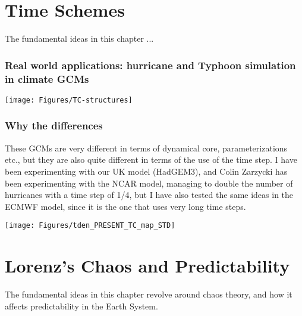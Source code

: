 \documentclass[11pt,fleqn]{book} %
\begin{document}
	
	
\newpage	
{} %
\chapter{Time Schemes}
	\vspace{1em}
	
The fundamental ideas in this chapter ...
	

\subsection{Real world applications: hurricane and Typhoon simulation in climate GCMs}

\begin{center}	
	\texttt{[image: Figures/TC-structures]}
\end{center}

\subsection{Why the differences}
These GCMs are very different in terms of dynamical core, parameterizations etc., but they are also quite different in terms of the use of the time step. I have been experimenting with our UK model (HadGEM3), and Colin Zarzycki has been experimenting with the NCAR model, managing to double the number of hurricanes with a time step of 1/4, but I have also tested the same ideas in the ECMWF model, since it is the one that uses very long time steps.
\begin{center}	
	\texttt{[image: Figures/tden\_PRESENT\_TC\_map\_STD]}
\end{center}
	
	
\chapter{Lorenz's Chaos and Predictability}
	
\vspace{1em}
	
The fundamental ideas in this chapter revolve around chaos theory, and how it affects predictability in the Earth System.
	
\vspace{1em}
	
\end{document}
